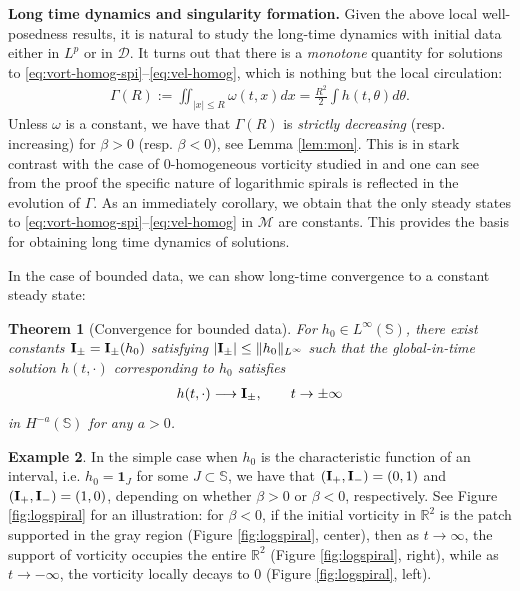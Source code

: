 \documentclass[10pt]{article}
\newtheorem{theorem}{Theorem}[section]
\theoremstyle{definition}
\newtheorem{example}[theorem]{Example}
\theoremstyle{remark}
\numberwithin{equation}{section}
\newcommand{\nrm}[1]{\Vert#1\Vert}
\newcommand{\0}{\emptyset}
\newcommand{\bt}{\beta}
\newcommand{\Gmm}{\Gamma}
\newcommand{\tht}{\theta}
\newcommand{\omg}{\omega}
\newcommand{\bfI}{{\bf I}}
\newcommand{\bbR}{\mathbb R}
\newcommand{\bbS}{\mathbb S}
\newcommand{\calD}{\mathcal D}
\newcommand{\calM}{\mathcal M}
\begin{document}
	
	
	
	
	\medskip
	
	\noindent \textbf{Long time dynamics and singularity formation.} Given the above local well-posedness results, it is natural to study the long-time dynamics with initial data either in $L^p$ or in $\calD$. It turns out that there is a \textit{monotone} quantity for solutions to \eqref{eq:vort-homog-spi}--\eqref{eq:vel-homog}, which is nothing but the local circulation: \begin{equation}\label{eq:entropy spirals}
		\begin{split}
			\Gmm(R) := \iint_{|x|\le R} \omg(t,x) dx = \frac{R^2}{2} \int h(t,\tht)d\tht.  
		\end{split}
	\end{equation} Unless $\omg$ is a constant, we have that $\Gmm(R)$ is \textit{strictly decreasing} (resp. increasing) for $\bt>0$ (resp. $\bt<0$), see Lemma \ref{lem:mon}. This is in stark contrast with the case of $0$-homogeneous vorticity studied in \cite{EJ,EMS} and one can see from the proof the specific nature of logarithmic spirals is reflected in the evolution of $\Gmm$. As an immediately corollary, we obtain that the only steady states to \eqref{eq:vort-homog-spi}--\eqref{eq:vel-homog} in $\calM$ are constants. This provides the basis for obtaining long time dynamics of solutions. 
	
	\medskip  
	
	In the case of bounded data, we can show long-time convergence to a constant steady state: 
	\begin{theorem}[Convergence for bounded data] \label{thm:conv}
		For $h_0 \in L^\infty(\bbS)$, there exist constants $\bfI_{\pm} = \bfI_{\pm}(h_0)$ satisfying $|\bfI_{\pm}|\le \nrm{h_0}_{L^\infty}$ such that the global-in-time solution $h(t,\cdot)$ corresponding to $h_0$ satisfies \begin{equation*}
			\begin{split}
				h(t,\cdot) \longrightarrow \bfI_{\pm},\qquad t \to \pm\infty		\end{split}
		\end{equation*} in $H^{-a}(\bbS)$ for any $a>0$. 
	\end{theorem}
	
	\begin{example}
		In the simple case when $h_0$ is the characteristic function of an interval, i.e. $h_0 =  \mathbf{1}_{J}$ for some $J\subset \bbS$, we have that $(\bfI_+,\bfI_-)=(0,1)$ and $(\bfI_+,\bfI_-)=(1,0)$, depending on whether $\bt>0$ or $\bt<0$, respectively. See Figure \ref{fig:logspiral} for an illustration: for $\bt<0$, if the initial vorticity in $\bbR^{2}$ is the patch supported in the gray region (Figure \ref{fig:logspiral}, center), then as $t\to\infty$, the support of vorticity occupies the entire $\bbR^2$ (Figure \ref{fig:logspiral}, right), while as $t\to-\infty$, the vorticity locally decays to 0 (Figure \ref{fig:logspiral}, left). 
	\end{example}
	
\end{document}
